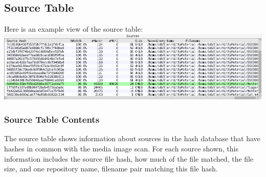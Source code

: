 \documentclass[11pt,fleqn]{article} %
\begin{document}
\subsection{Source Table}
Here is an example view of the source table:\\
\includegraphics[scale=.4]{screenshots/source_table}\\

\subsubsection{Source Table Contents}
The source table shows information about sources in the hash database that have hashes in common with the media image scan. For each source shown, this information includes the source file hash, how much of the file matched, the file size, and one repository name, filename pair matching this file hash.\\
\end{document}
